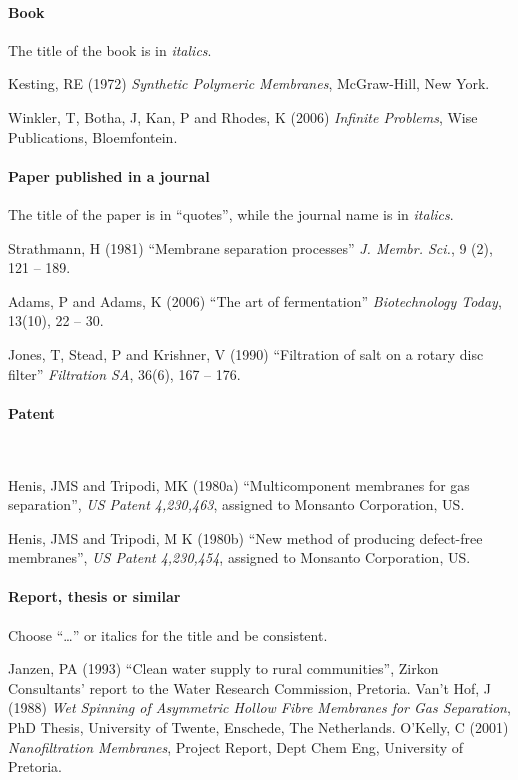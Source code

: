 \documentclass[a5paper, 10pt]{article}
\begin{document}
\paragraph{Book}
The title of the book is in \emph{italics}.

Kesting, RE (1972) \textit{Synthetic Polymeric Membranes},
  McGraw-Hill, New York.

Winkler, T, Botha, J, Kan, P and Rhodes, K (2006)
  \textit{Infinite Problems}, Wise Publications, Bloemfontein.

\paragraph{Paper published in a journal}
The title of the paper is in ``quotes'', while the journal name is in \emph{italics}.

Strathmann, H (1981) ``Membrane separation processes''
  \textit{J.  Membr.  Sci.}, 9 (2), 121 -- 189.

Adams, P and Adams, K (2006) ``The art of fermentation''
  \textit{Biotechnology Today}, 13(10), 22 -- 30.

Jones, T, Stead, P and Krishner, V (1990) ``Filtration of salt
  on a rotary disc filter'' \textit{Filtration SA}, 36(6), 167 -- 176.

\paragraph{Patent}
~

Henis, JMS and Tripodi, MK  (1980a) ``Multicomponent membranes
for gas separation'', \textit{US Patent 4,230,463}, assigned to Monsanto
Corporation, US.

Henis, JMS and Tripodi, M K (1980b) ``New method of producing
  defect-free membranes'', \textit{US Patent 4,230,454}, assigned to
  Monsanto Corporation, US.

\paragraph{Report, thesis or similar}
Choose ``\dots'' or italics for the title and be consistent.

Janzen, PA (1993) ``Clean water supply to rural communities'',
  Zirkon Consultants' report to the Water Research Commission,
  Pretoria.
Van't Hof, J (1988) \textit{Wet Spinning of Asymmetric Hollow
    Fibre Membranes for Gas Separation}, PhD Thesis, University of
  Twente, Enschede, The Netherlands.
O'Kelly, C (2001) \textit{Nanofiltration Membranes}, Project
  Report, Dept Chem Eng, University of Pretoria.
\end{document}

